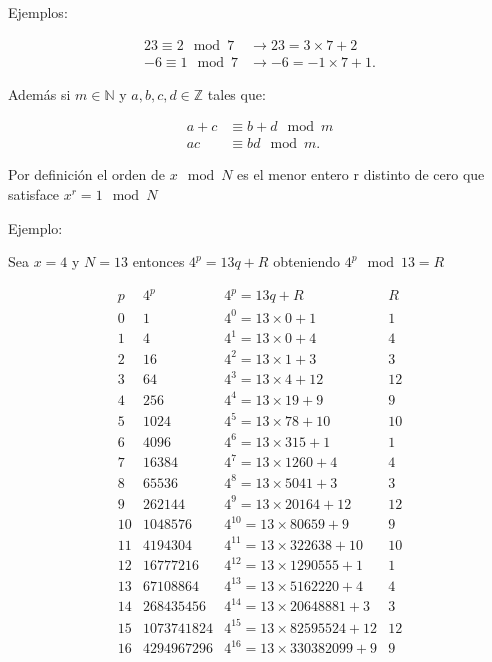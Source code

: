  Ejemplos:

\begin{align*}
    23 \equiv 2 \mod 7 &\rightarrow 23 = 3 \times 7 + 2 \\
    -6 \equiv 1 \mod 7 &\rightarrow -6 = -1 \times 7 +1 .
\end{align*}

 Además si $m \in \mathds{N}$ y $a,b,c,d \in \mathds{Z}$ tales que:

\begin{align*}
    a+c &\equiv b+d \mod m \\
    a c &\equiv b d \mod m .
\end{align*}

 Por definición el orden de $x \mod N$ es el menor entero r distinto de cero que satisface $x^r = 1 \mod N$
 
Ejemplo:

 Sea $x = 4$ y $N = 13$ entonces $4^p = 13 q + R$ obteniendo $4^p \mod 13 = R$

 \[\begin{matrix}
         p  &   4^p & 4^p = 13 q                         + R    &   R   \\
         0  &   1   & 4^0 = 13\times0                    + 1    & 1     \\
         1  &   4   & 4^1 = 13\times0                    + 4    & 4     \\
         2  &   16  & 4^2 = 13\times1                    + 3    & 3     \\
         3  &   64  & 4^3 = 13\times4                    + 12   & 12    \\
         4  &   256  & 4^4 = 13\times19                  + 9    & 9     \\
         5  &   1024  & 4^5 = 13\times78                 + 10   & 10    \\
         6  &   4096  & 4^6 = 13\times315                + 1    & 1     \\
         7  &   16384  & 4^7 = 13\times1260              + 4    & 4     \\
         8  &   65536  & 4^8 = 13\times5041              + 3    & 3     \\
         9  &   262144  & 4^9 = 13\times20164            + 12   & 12    \\
         10 &   1048576  & 4^10 = 13\times80659          + 9    & 9     \\
         11 &   4194304  & 4^11 = 13\times322638         + 10   & 10    \\
         12 &   16777216  & 4^12 = 13\times1290555       + 1    & 1     \\
         13 &   67108864  & 4^13 = 13\times5162220       + 4    & 4     \\
         14 &   268435456  & 4^14 = 13\times20648881     + 3    & 3     \\
         15 &   1073741824  & 4^15 = 13\times82595524    + 12   & 12    \\
         16 &   4294967296  & 4^16 = 13\times330382099   + 9    & 9     
     \end{matrix}
 \]

